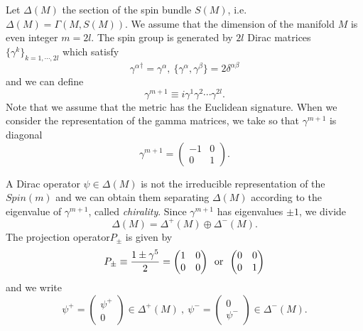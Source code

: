 \documentclass[a4paper,pdftex,10pt]{report}
\begin{document}
Let $\Delta(M)$ the section of the spin bundle $S(M)$, i.e. $\Delta(M)=\Gamma(M,S(M))$. We assume that the dimension of the manifold $M$ is even integer $m=2l$. The spin group is generated by $2l$ Dirac matrices $\{\gamma^{k}\}_{k=1,\cdots,2l}$  which satisfy
\begin{equation}
  {\gamma^{\alpha}}^{\dag}
  =
  \gamma^{\alpha}
  ,\ 
  \{\gamma^{\alpha},\gamma^{\beta}\}
  =
  2\delta^{\alpha\beta}
\end{equation} 
and we can define 
\begin{equation}
  \gamma^{m+1}
  \equiv
  i\gamma^{1}\gamma^{2}\cdots\gamma^{2l}
  .
\end{equation}
Note that we assume that the metric has the Euclidean signature. When we consider the representation of the gamma matrices, we take so that $\gamma^{m+1}$ is diagonal
\begin{equation}
  \gamma^{m+1}
  =
  \begin{pmatrix}
    -1 & 0 \\
    0 & 1
  \end{pmatrix}
  .
\end{equation}

A Dirac operator $\psi\in\Delta(M)$ is not the irreducible representation of the $Spin(m)$ and we can obtain them separating $\Delta(M)$ according to the eigenvalue of $\gamma^{m+1}$, called \textit{chirality}. Since $\gamma^{m+1}$ has eigenvalues $\pm 1$, we divide 
\begin{equation}
  \Delta(M)
  =
  \Delta^{+}(M)
  \oplus
  \Delta^{-}(M)
  .
\end{equation}
The projection operator$P_{\pm}$ is given by 
\begin{equation}
  P_{\pm}
  \equiv
  \frac{1\pm \gamma^{5}}{2}
  =
  \begin{pmatrix}
    1 & 0 \\
    0 & 0
  \end{pmatrix}
  \hspace*{5pt}\textrm{or}\hspace*{5pt}
  \begin{pmatrix}
    0 & 0 \\
    0 & 1
  \end{pmatrix}
\end{equation}
and we write 
\begin{equation}
  \psi^{+}
  =
  \begin{pmatrix}
    \psi^{+} \\
    0
  \end{pmatrix}
  \in 
  \Delta^{+}(M)
  \ ,\ 
  \psi^{-}
  =
  \begin{pmatrix}
    0 \\
    \psi^{-}
  \end{pmatrix}
  \in 
  \Delta^{-}(M)
  .
\end{equation}
\end{document}

